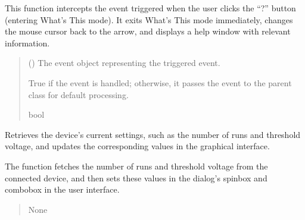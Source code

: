 \documentclass[letterpaper,10pt,english]{sphinxmanual}
\begin{document}
\begin{fulllineitems}
\begin{fulllineitems}
\sphinxAtStartPar
This function intercepts the event triggered when the user clicks the “?” button (entering What’s This mode). 
It exits What’s This mode immediately, changes the mouse cursor back to the arrow, and displays a help window with relevant information.
\begin{quote}\begin{description}
\sphinxAtStartPar
{} () \textendash{} The event object representing the triggered event.

\sphinxAtStartPar
True if the event is handled; otherwise, it passes the event to the parent class for default processing.

\sphinxAtStartPar
bool

\end{description}\end{quote}

\end{fulllineitems}


\begin{fulllineitems}
\label{\detokenize{generalsettings:generalsettings.GeneralSettingsWindow.getsettings}}
\pysigstartsignatures
{}
\pysigstopsignatures
\sphinxAtStartPar
Retrieves the device’s current settings, such as the number of runs and threshold voltage, 
and updates the corresponding values in the graphical interface.

\sphinxAtStartPar
The function fetches the number of runs and threshold voltage from the connected device, 
and then sets these values in the dialog’s spinbox and combobox in the user interface.
\begin{quote}\begin{description}
\sphinxAtStartPar
None

\end{description}\end{quote}

\end{fulllineitems}



\end{fulllineitems}
\end{document}
